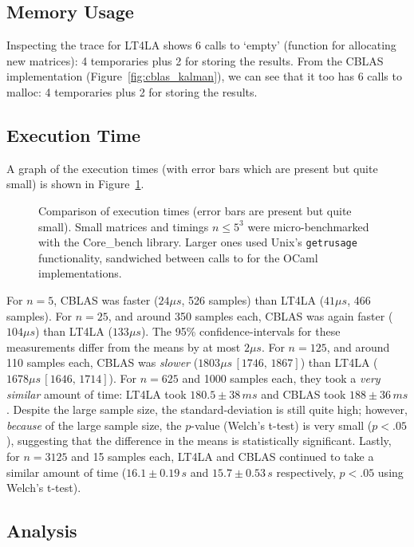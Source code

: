 \subsection{Memory Usage}

Inspecting the trace for LT4LA shows 6 calls to `empty' (function for
allocating new matrices): 4 temporaries plus 2 for storing the results. From
the CBLAS implementation (Figure~\ref{fig:cblas_kalman}), we can see that it
too has 6 calls to malloc: 4 temporaries plus 2 for storing the results.

\subsection{Execution Time}

A graph of the execution times (with error bars which are present but quite
small) is shown in Figure~\ref{fig:timings}.

\begin{figure}[t]
    \centering
    
    \caption{Comparison of execution times (error bars are present but quite
        small). Small matrices and timings $n \le 5^3$ were micro-benchmarked
        with the Core\_bench library. Larger ones used Unix's
        \texttt{getrusage} functionality, sandwiched between calls to
         for the OCaml implementations.}\label{fig:timings}
\end{figure}

For $n=5$, CBLAS was faster ($24\mu s$, 526 samples) than LT4LA ($41 \mu s$,
466 samples).  For $n=25$, and around 350 samples each, CBLAS was again faster
($104 \mu s$) than LT4LA ($133 \mu s$). The 95\% confidence-intervals for these
measurements differ from the means by at most $2 \mu s$. For $n=125$, and
around 110 samples each, CBLAS was \emph{slower} ($1803 \mu s\, [1746,\, 1867]$)
than LT4LA ($1678 \mu s\, [1646,\, 1714]$). For $n=625$ and 1000 samples each,
they took a \emph{very similar} amount of time: LT4LA took $180.5 \pm 38 \,ms$
and CBLAS took $188 \pm 36 \, ms$. Despite the large sample size, the
standard-deviation is still quite high; however, \emph{because} of the large
sample size, the $p$-value (Welch's t-test) is very small ($p < .05$),
suggesting that the difference in the means is statistically significant.
Lastly, for $n=3125$ and 15 samples each, LT4LA and CBLAS continued to take a
similar amount of time ($16.1 \pm 0.19 \,s$ and $15.7 \pm 0.53 \,s$
respectively, $p<.05$ using Welch's t-test).

\subsection{Analysis}

